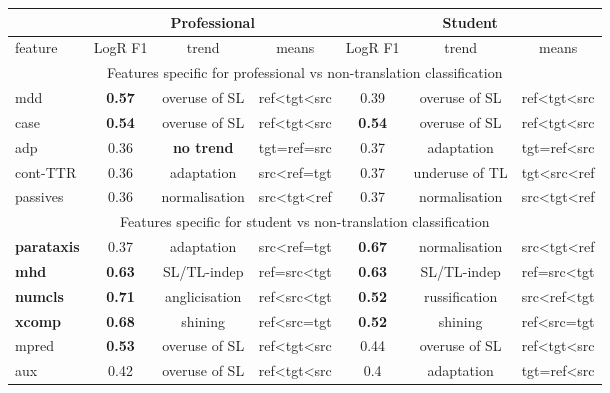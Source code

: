 \begin{longtable}[H]{p{1.84cm}|ccc||ccc}
	\toprule
	&      \multicolumn{3}{c}{Professional} 	&      \multicolumn{3}{c}{Student}\\
	\midrule
	feature & LogR F1 & trend & means   & LogR F1 & trend   & means   \\
	\midrule
	\multicolumn{7}{c}{Features specific for professional vs non-translation classification} \\
	\midrule
	mdd           & \textbf{0.57} & overuse of SL & ref\textless{}tgt\textless{}src & 0.39 & overuse of SL  & ref\textless{}tgt\textless{}src \\
	case          & \textbf{0.54} & overuse of SL & ref\textless{}tgt\textless{}src & \textbf{0.54} & overuse of SL  & ref\textless{}tgt\textless{}src \\
	adp           & 0.36 & \textbf{no trend}       & tgt=ref=src                     & 0.37 & adaptation     & tgt=ref\textless{}src           \\
	cont-TTR  & 0.36 & adaptation    & src\textless{}ref=tgt           & 0.37 & underuse of TL & tgt\textless{}src\textless{}ref \\
	passives      & 0.36 & normalisation & src\textless{}tgt\textless{}ref & 0.37 & normalisation  & src\textless{}tgt\textless{}ref \\
	\midrule
	\multicolumn{7}{c}{Features specific for student vs non-translation classification} \\
	\midrule
	\textbf{parataxis}     & 0.37 & adaptation    & src\textless{}ref=tgt           & \textbf{0.67} & normalisation & src\textless{}tgt\textless{}ref \\
	\textbf{mhd}           & \textbf{0.63} & SL/TL-indep   & ref=src\textless{}tgt           & \textbf{0.63} & SL/TL-indep   & ref=src\textless{}tgt           \\
	\textbf{numcls}        & \textbf{0.71} & anglicisation & ref\textless{}src\textless{}tgt & \textbf{0.52} & russification & src\textless{}ref\textless{}tgt \\
	\textbf{xcomp}         & \textbf{0.68} & shining       & ref\textless{}src=tgt           & \textbf{0.52} & shining       & ref\textless{}src=tgt           \\
	mpred         & \textbf{0.53} & overuse of SL & ref\textless{}tgt\textless{}src & 0.44 & overuse of SL & ref\textless{}tgt\textless{}src \\
	aux           & 0.42 & overuse of SL & ref\textless{}tgt\textless{}src & 0.4  & adaptation    & tgt=ref\textless{}src           \\

\end{longtable}
